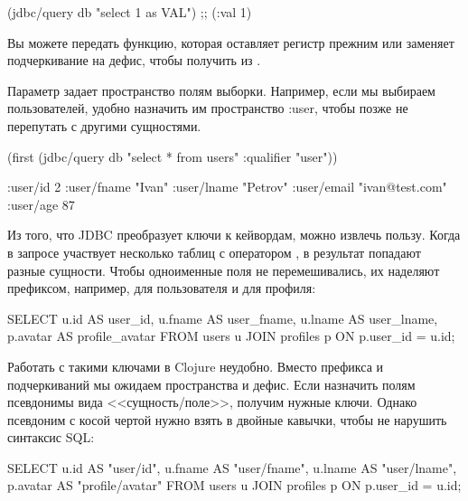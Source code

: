 \begin{english}
  \begin{clojure}
(jdbc/query db "select 1 as VAL")
;; ({:val 1})
  \end{clojure}
\end{english}

Вы можете передать функцию, которая оставляет регистр прежним или заменяет подчеркивание на дефис, чтобы получить  из .

Параметр  задает пространство полям выборки. Например, если мы выбираем пользователей, удобно назначить им пространство :user, чтобы позже не перепутать с другими сущностями.

\begin{english}
  \begin{clojure}
(first (jdbc/query db "select * from users" {:qualifier "user"}))

{:user/id 2
 :user/fname "Ivan"
 :user/lname "Petrov"
 :user/email "ivan@test.com"
 :user/age 87}
  \end{clojure}
\end{english}

Из того, что JDBC преобразует ключи к кейвордам, можно извлечь пользу. Когда в запросе участвует несколько таблиц с оператором , в результат попадают разные сущности. Чтобы одноименные поля не перемешивались, их наделяют префиксом, например,  для пользователя и  для профиля:

\begin{english}
  \begin{sql}
SELECT
  u.id     AS user_id,
  u.fname  AS user_fname,
  u.lname  AS user_lname,
  p.avatar AS profile_avatar
FROM users u
JOIN profiles p ON p.user_id = u.id;
  \end{sql}
\end{english}

Работать с такими ключами в Clojure неудобно. Вместо префикса и подчеркиваний мы ожидаем пространства и дефис. Если назначить полям псевдонимы вида <<сущность/поле>>, получим нужные ключи. Однако псевдоним с косой чертой нужно взять в двойные кавычки, чтобы не нарушить синтаксис SQL:

\begin{english}
  \begin{sql}
SELECT
  u.id     AS "user/id",
  u.fname  AS "user/fname",
  u.lname  AS "user/lname",
  p.avatar AS "profile/avatar"
FROM users u
JOIN profiles p ON p.user_id = u.id;
  \end{sql}
\end{english}

